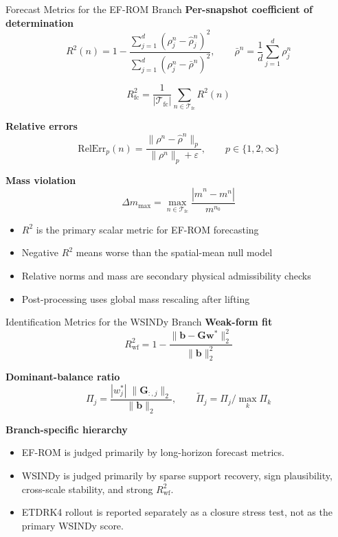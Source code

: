 \begin{frame}[shrink=8]{Forecast Metrics for the EF-ROM Branch}
\small
\textbf{Per-snapshot coefficient of determination}
\[
  R^2(n)
  =
  1-
  \frac{\sum_{j=1}^{d}(\rho_j^n-\hat\rho_j^n)^2}
       {\sum_{j=1}^{d}(\rho_j^n-\bar\rho^n)^2},
  \qquad
  \bar\rho^n=\frac{1}{d}\sum_{j=1}^{d}\rho_j^n
\]

\[
  R^2_{\mathrm{fc}}
  =
  \frac{1}{|\mathcal{T}_{\mathrm{fc}}|}
  \sum_{n\in\mathcal{T}_{\mathrm{fc}}} R^2(n)
\]

\textbf{Relative errors}
\[
  \mathrm{RelErr}_p(n)=
  \frac{\|\rho^n-\hat\rho^n\|_p}{\|\rho^n\|_p+\varepsilon},
  \qquad p\in\{1,2,\infty\}
\]

\textbf{Mass violation}
\[
  \Delta m_{\max}
  =
  \max_{n\in\mathcal{T}_{\mathrm{fc}}}
  \frac{|\hat m^n-m^n|}{m^{n_0}}
\]

\begin{itemize}
  \item $R^2$ is the primary scalar metric for EF-ROM forecasting
  \item Negative $R^2$ means worse than the spatial-mean null model
  \item Relative norms and mass are secondary physical admissibility checks
  \item Post-processing uses global mass rescaling after lifting
\end{itemize}
\end{frame}

\begin{frame}[shrink=8]{Identification Metrics for the WSINDy Branch}
\small
\textbf{Weak-form fit}
\[
  R^2_{\mathrm{wf}}
  =
  1-
  \frac{\|\mathbf{b}-\mathbf{G}\mathbf{w}^*\|_2^2}
       {\|\mathbf{b}\|_2^2}
\]

\textbf{Dominant-balance ratio}
\[
  \Pi_j
  =
  \frac{|w_j^*|\;\|\mathbf{G}_{:,j}\|_2}{\|\mathbf{b}\|_2},
  \qquad
  \tilde\Pi_j=\Pi_j/\max_k \Pi_k
\]

\textbf{Branch-specific hierarchy}
\begin{itemize}
  \item EF-ROM is judged primarily by long-horizon forecast metrics.
  \item WSINDy is judged primarily by sparse support recovery, sign plausibility, cross-scale stability, and strong $R^2_{\mathrm{wf}}$.
  \item ETDRK4 rollout is reported separately as a closure stress test, not as the primary WSINDy score.
\end{itemize}
\end{frame}
\fi

